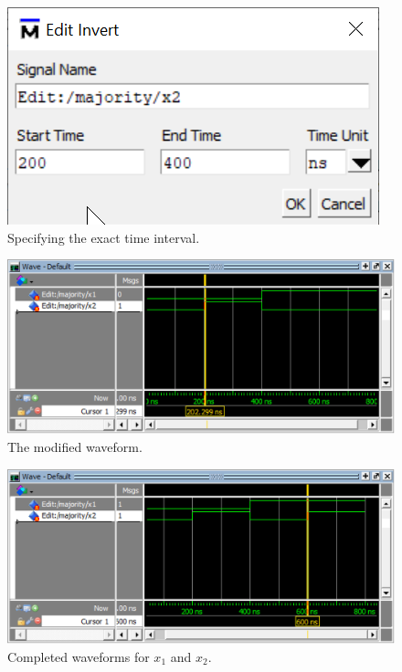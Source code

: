 \documentclass[11pt, twoside, pdftex]{article}
\begin{document}
\begin{figure}[H]
   \begin{center}
      \includegraphics[scale=1.0]{figures/figure17.png}
   \caption{Specifying the exact time interval.} 
	 \label{fig:17}
	 \end{center}
\end{figure}

\begin{figure}[H]
   \begin{center}
      \includegraphics[scale=0.75]{figures/figure18.png}
   \caption{The modified waveform.} 
	 \label{fig:18}
	 \end{center}
\end{figure}

\begin{figure}[H]
   \begin{center}
      \includegraphics[scale=0.75]{figures/figure19.png}
   \caption{Completed waveforms for $x_1$ and $x_2$.} 
	 \label{fig:19}
	 \end{center}
\end{figure}
\end{document}
